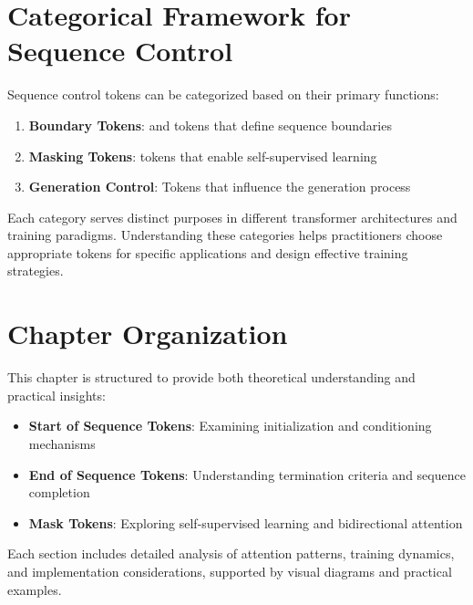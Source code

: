 \section{Categorical Framework for Sequence Control}

Sequence control tokens can be categorized based on their primary functions:

\begin{enumerate}
\item \textbf{Boundary Tokens}: \sos{} and \eos{} tokens that define sequence boundaries
\item \textbf{Masking Tokens}: \mask{} tokens that enable self-supervised learning
\item \textbf{Generation Control}: Tokens that influence the generation process
\end{enumerate}

Each category serves distinct purposes in different transformer architectures and training paradigms. Understanding these categories helps practitioners choose appropriate tokens for specific applications and design effective training strategies.

\section{Chapter Organization}

This chapter is structured to provide both theoretical understanding and practical insights:

\begin{itemize}
\item \textbf{Start of Sequence Tokens}: Examining initialization and conditioning mechanisms
\item \textbf{End of Sequence Tokens}: Understanding termination criteria and sequence completion
\item \textbf{Mask Tokens}: Exploring self-supervised learning and bidirectional attention
\end{itemize}

Each section includes detailed analysis of attention patterns, training dynamics, and implementation considerations, supported by visual diagrams and practical examples.
